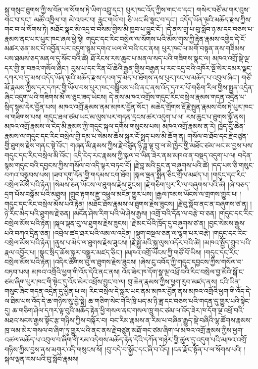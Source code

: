 \documentclass{article}
\begin{document}
སྐུ་གསུང་ཐུགས་ཀྱི་ས་བོན་ལ་སོགས་ཏེ་ཡིག་འབྲུ་དང་། པུར་ཁང་འོད་ཀྱིས་གང་བ་དང་། གསེར་བཙོ་མ་གར་བུས་གང་བ་དང་། མཚོ་འཁྱིལ་བ། མེ་འབར་བ། རླུང་གཡོ་བ། ཅི་ཡང་མི་སྣང་བ་དང་། འདོད་ཡོན་ལྔའི་མཆོད་རྫས་ཀྱིས་གང་བ་ལ་སོགས་ཏེ། མཐོང་སྣང་མི་འདྲ་བ་བསམ་གྱིས་མི་ཁྱབ་པ་བྱུང་ངོ་། །དེ་ནས་གྲྭ་པ་བུ་སློབ་ཉ་མ་དང་བཅས་པ་རྣམས་ནང་པར་པུར་ཁང་ཞལ་ཕྱེ་སྟེ། གདུང་དང་རིང་བསྲེལ་ལ་སོགས་པའི་མོས་གུས་ཀྱི་རྟེན་རྣམས་འགྱེད་དེ་ངོ་མཚར་ཅན་མང་པོ་འབྱོན་པར་འདུག་སྙམ་དགའ་ཡལ་ལེ་བའི་ངང་ནས། པུར་ཁང་ལ་མགོ་བསྟན་ནས་གཟིམས་པས་ཐམས་ཅད་མནལ་དུ་སོང་བའི་ཚེ། ཐོ་རེངས་རས་ཆུང་པ་མནལ་སད་པའི་གཟིགས་སྣང་ལ། མཁའ་འགྲོ་སྡེ་ལྔ་དར་གྱི་ན་བཟའ་གསོལ་ཞིང་། རུས་པ་དང་རིན་པོ་ཆེའི་རྒྱན་གྱིས་བརྒྱན་པ་རང་འདྲ་བའི་འཁོར་སྔོ་སེར་དམར་ལྗང་དཀར་བ་དུ་མས་འདོད་ཡོན་ལྔའི་མཆོད་རྫས་དཔག་ཏུ་མེད་པ་ཐོགས་ནས་པུར་ཁང་ལ་མཆོད་པ་འབུལ་ཞིང་། གཙོ་མོ་རྣམས་ཀྱིས་དར་དཀར་གྱི་ཡོལ་བས་པུར་ཁང་བསྒྲིབས་པའི་ནང་ནས་འོད་དཀར་པོ་གཅིག་རིལ་གྱིས་སྤྱན་འདྲེན་ཞིང་འདུག་པའི་གཟིགས་མོ་ལ་ཅུང་ཟད་ཡེངས། དེ་ནས་མཁའ་འགྲོས་གདུང་རིང་བསྲེལ་རྣམས་གདན་འདྲེན་པ་སྲིད་སྙམ་དེར་བྱོན་པས། མཁའ་འགྲོ་རྣམས་ནམ་མཁར་བྱོན་སོང་། མཆེད་གྲོགས་རྡོ་རྗེ་སྤུན་རྣམས་བོས་ཏེ་པུར་ཁང་ལ་གཟིགས་པས། གདུང་ཐལ་ཙམ་ཡང་མ་ལུས་པར་གདན་དྲངས་ཚར་འདུག་པ་ལ། རས་ཆུང་པ་ཐུགས་སྐྱོ་ནས། མཁའ་འགྲོ་རྣམས་ལ་ངེད་མི་རྣམས་ཀྱི་གདུང་སྐལ་དགོས་གསུངས་པས། མཁའ་འགྲོ་རྣམས་ན་རེ། ཁྱེད་བུ་ཆེན་རྣམས་ལ་གདུང་དང་རིང་བསྲེལ་གྱི་དམ་པ་སེམས་ཆོས་སྐུར་ངོ་སྤྲད་པས་མི་ཆོག་ན། གསོལ་བ་ཐོབ་དང་རྗེ་བཙུན་གྱི་ཐུགས་རྗེས་གནང་སྟེ་འོང་། གཞན་མི་རྣམས་ཀྱིས་རྗེ་བཙུན་ཉི་ཟླ་ལྟ་བུ་ལ་མེ་ཁྱེར་གྱི་མཐོང་ཙམ་ཡང་མ་བྱས་པས་གདུང་དང་རིང་བསྲེལ་མི་འོང་། འདི་ངེད་རང་རྣམས་ཀྱི་སྐལ་བ་ཡིན་ཟེར་ནམ་མཁའ་ན་བསྡད་འདུག་པ་ལ། བདེན་སྙམ་གདུང་བའི་དབྱངས་ཀྱིས་གསོལ་བ་འདི་ལྟར་བཏབ་བོ། །རྗེ་བླ་མའི་དྲུང་ན་བཞུགས་པའི་ཚེ། །དད་པས་ཅི་གསུང་བཀའ་བསྒྲུབས་པས། །ཟབ་དགུ་དོན་གྱི་གདམས་ངག་ཐོབ། །སྐལ་ལྡན་སྨིན་ཅིང་གྲོལ་མཛད་པ། །གདུང་དང་རིང་བསྲེལ་མོས་པའི་རྟེན། །སེམས་ཅན་ཡོངས་ལ་ཐུགས་རྗེས་ཟུངས། །རྗེ་གཅིག་པུར་རི་ལ་བཞུགས་པའི་ཚེ། །ཞེ་བཅད་དྲག་པོས་བསྒོམ་པའི་མཐུས། །གྲུབ་རྟགས་རྫུ་འཕྲུལ་མངོན་གྱུར་པས། །རྒྱལ་ཁམས་ཡོངས་ལ་གྲགས་གྱུར་པ། །གདུང་དང་རིང་བསྲེལ་མོས་པའི་རྟེན། །མཐོང་ཐོས་རྣམས་ལ་ཐུགས་རྗེས་ཟུངས། །རྗེ་བུ་སློབ་ནང་ན་བཞུགས་ཙ་ན། །ཉེ་རིང་མེད་པའི་ཐུགས་རྗེ་ཅན། །མངོན་ཤེས་རིག་པའི་ཡེ་ཤེས་རྒྱས། །འགྲོ་བའི་དོན་ལ་བརྩེ་བ་ཅན། །གདུང་དང་རིང་བསྲེལ་མོས་པའི་རྟེན། །སྐལ་ལྡན་བུ་ལ་ཐུགས་རྗེས་ཟུངས། །རྗེ་མང་པོའི་ཁྲོད་དུ་བཞུགས་ཙ་ན། །བྱང་སེམས་རྒྱས་པའི་བཀའ་དྲིན་ཅན། །འབྲེལ་ཚད་ཐར་པའི་ལམ་ལ་འདྲེན། །སྡུག་བསྔལ་ཅན་ལ་ལྷག་པར་བརྩེ། །གདུང་དང་རིང་བསྲེལ་མོས་པའི་རྟེན། །ནུས་པ་མེད་ལ་ཐུགས་རྗེས་ཟུངས། །རྗེ་སྒྱུ་མའི་སྐུ་ལུས་འདོར་བའི་ཚེ། །མཁའ་སྤྱོད་གྲུབ་པའི་རྣལ་འབྱོར་པ། །སྣང་སྲིད་ཆོས་སྐུར་བསྒྱུར་མཛད་ཅིང་། །མཁའ་འགྲོ་ཡོངས་ཀྱི་གཙོ་བོ་ཡིས། །གདུང་དང་རིང་བསྲེལ་མོས་པའི་རྟེན། །འདིར་ཚོགས་བུ་ལ་ཐུགས་རྗེས་ཟུངས། །ཞེས་ངུ་འབོད་ཀྱི་གདུང་དབྱངས་ཀྱིས་གསོལ་བ་བཏབ་པས། མཁའ་འགྲོའི་ཕྱག་གི་འོད་དེའི་ནང་ནས། འོད་ཟེར་ཁ་དོག་སྣ་ལྔ་འཕྲོ་བའི་རིང་བསྲེལ་བྱ་མོའི་སྒོ་ང་ཙམ་ཞིག་པུར་ཁང་གི་སྟེང་དུ་འོད་མེར་འཕྲོས་བྱུང་བ་ལ། བུ་ཆེན་རྣམས་ཀྱིས་ཕྱག་རུབ་མཛད་ནས། ངའི་ཡིན་གསུང་ཞིང་གདན་འདྲེན་དུ་ཕྱིན་པ་ལ། རིང་བསྲེལ་དེ་སླར་ཡང་ནམ་མཁར་བྱོན་ནས་མཁའ་འགྲོའི་ཕྱག་གི་འོད་དེ་ལ་ཐིམ་པས་འོད་དེ་ཆ་གཉིས་སུ་བྱེ་སྟེ། ཆ་གཅིག་སེང་གེའི་ཁྲི་པད་མ་ཉི་ཟླ་དང་བཅས་པའི་གདན་དུ་གྱུར་པའི་སྟེང་དུ། ཆ་གཅིག་ཤེལ་དཀར་ལྟ་བུའི་མཆོད་རྟེན་ཕྱི་གསལ་ནང་གསལ་ཁྲུ་གང་ཙམ་ལ་འོད་ཟེར་ཁ་དོག་ལྔ་འཕྲོ་བའི་མཐའ་སངས་རྒྱས་སྟོང་རྩ་གཉིས་ཀྱིས་བསྐོར་བ། བང་རིམ་རྣམས་ན་རིམ་པ་བཞིན་རྒྱུད་སྡེ་བཞིའི་ལྷ་ཚོགས་རྣམས་ཁྲ་ལམ་མེར་གསལ་བ་ཞིག་ཏུ་གྱུར་པའི་ནང་ནས་རྗེ་བཙུན་མཐོ་གང་ཙམ་ཞིག་ལ་མཁའ་འགྲོ་རྣམས་ཀྱིས་ཕྱག་འཚལ་མཆོད་པ་འབུལ་བ་ཞིག་གི་རམ་འདེགས་མཆོད་རྟེན་དེའི་དཀོན་གཉེར་གྱི་ཚུལ་དུ་འདུག་པའི་མཁའ་འགྲོ་གཉིས་ཀྱིས་བྱས་ནས་མགུར་འདི་གསུངས་སོ། །བུ་བདེ་བ་སྐྱོང་དང་ཞི་བ་འོད། །ངན་རྫོང་སྟོན་པ་ལ་སོགས་པའི། །སྐལ་ལྡན་རས་པའི་བུ་སློབ་རྣམས། 
\end{document}

